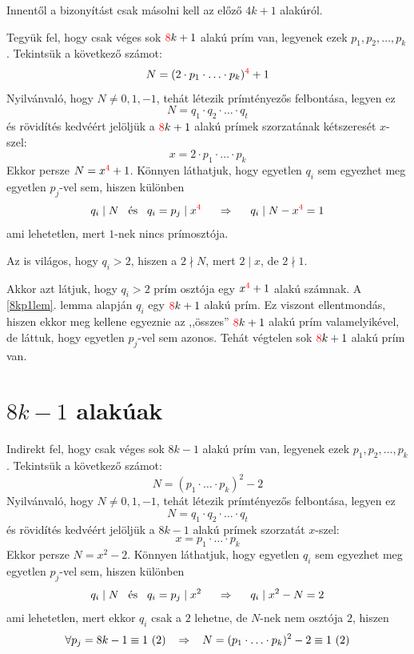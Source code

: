 \documentclass[12pt]{book}
\theoremstyle{plain} %
\theoremstyle{definition} %
\theoremstyle{remark}
\numberwithin{equation}{section}  %
\begin{document}
	Innentől a bizonyítást csak másolni kell az előző $4k+1$ alakúról.
	
	Tegyük fel, hogy csak véges sok $\color{red}8\color{black}k+1$ alakú prím van, legyenek ezek $p_1,p_2,\ldots,p_k$. Tekintsük a következő számot:
	\[ N = (2\cdot p_1\cdot \ldots \cdot p_k)^{\color{red}4} + 1  \]
	Nyilvánvaló, hogy $N\neq 0,1,-1$, tehát létezik prímtényezős felbontása, legyen ez
	\[ N = q_1\cdot q_2\cdot \ldots \cdot q_t  \]
	és rövidítés kedvéért jelöljük a $\color{red}8\color{black}k+1$ alakú prímek szorzatának kétszeresét $x$-szel:
	\[ x = 2\cdot p_1\cdot \ldots \cdot p_k   \]
	Ekkor persze $N=x^{\color{red} 4}+1$. Könnyen láthatjuk, hogy egyetlen $q_i$ sem egyezhet meg egyetlen $p_j$-vel sem, hiszen különben
	\[ q_i \mid N \hspace{3mm} \text{és} \hspace{3mm} q_i=p_j\mid x^{\color{red}4} \hspace{5mm} \Rightarrow \hspace{5mm} q_i\mid N-x^{\color{red}4}=1  \]
	ami lehetetlen, mert $1$-nek nincs prímosztója.
	
	Az is világos, hogy $q_i>2$, hiszen a $2\nmid N$, mert $2\mid x$, de $2\nmid 1$.
	
	Akkor azt látjuk, hogy $q_i>2$ prím osztója egy $x^{\color{red}4}+1$ alakú számnak. A \ref{8kp1lem}. lemma alapján $q_i$ egy $\color{red}8\color{black}k+1$ alakú prím. Ez viszont ellentmondás, hiszen ekkor meg kellene egyeznie az ,,összes'' $\color{red}8\color{black}k+1$  alakú prím valamelyikével, de láttuk, hogy egyetlen $p_j$-vel sem azonos. Tehát végtelen sok $\color{red}8\color{black}k+1$ alakú prím van.
	
	\section{$8k-1$ alakúak}
	
	Indirekt fel, hogy csak véges sok $8k-1$ alakú prím van, legyenek ezek $p_1,p_2,\ldots,p_k$. Tekintsük a következő számot:
	\[ N = (p_1\cdot \ldots \cdot p_k)^{2} - 2  \]
	Nyilvánvaló, hogy $N\neq 0,1,-1$, tehát létezik prímtényezős felbontása, legyen ez
	\[ N = q_1\cdot q_2\cdot \ldots \cdot q_t  \]
	és rövidítés kedvéért jelöljük a $8k-1$ alakú prímek szorzatát $x$-szel:
	\[ x = p_1\cdot \ldots \cdot p_k   \]
	Ekkor persze $N=x^{2}-2$. Könnyen láthatjuk, hogy egyetlen $q_i$ sem egyezhet meg egyetlen $p_j$-vel sem, hiszen különben
	\[ q_i \mid N \hspace{3mm} \text{és} \hspace{3mm} q_i=p_j\mid x^{2} \hspace{5mm} \Rightarrow \hspace{5mm} q_i\mid x^{2}-N=2  \]
	ami lehetetlen, mert ekkor $q_i$ csak a $2$ lehetne, de $N$-nek nem osztója $2$, hiszen
	\[ \forall p_j = 8k-1 \equiv 1\ (2) \hspace{3mm} \Rightarrow \hspace{3mm} N = (p_1\cdot \ldots \cdot p_k)^2 - 2 \equiv 1\ (2)  \]
	
\end{document}
